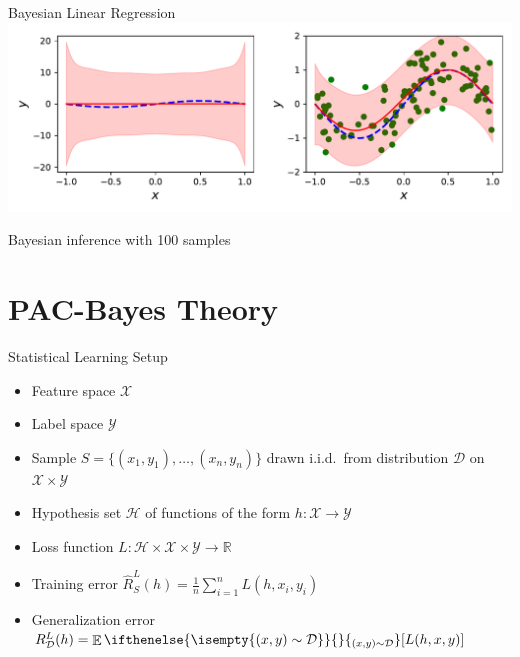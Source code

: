 \documentclass[aspectratio=169]{beamer}
\DeclareMathOperator*{\EvOp}{\mathbb{E}}
\newcommand{\CD}{\mathcal{D}}
\newcommand{\CH}{\mathcal{H}}
\newcommand{\CX}{\mathcal{X}}
\newcommand{\CY}{\mathcal{Y}}
\newcommand{\RR}{\mathbb{R}}
\newcommand*{\Ev}[2][]{%
  \mathchoice{%
    \EvOp\ifthenelse{\isempty{#1}}{}{_{#1}}\left[#2\right]%
  }{%
    \EvOp\ifthenelse{\isempty{#1}}{}{_{#1}}[#2]%
  }{%
    \EvOp\ifthenelse{\isempty{#1}}{}{_{#1}}[#2]%
  }{%
    \EvOp\ifthenelse{\isempty{#1}}{}{_{#1}}[#2]%
  }%
}
\begin{document}
\begin{frame}{Bayesian Linear Regression}
  \centering
  \includegraphics[width=\textwidth]{../figures/bayesian_regression_3.pdf}

  Bayesian inference with 100 samples
\end{frame}

\section{PAC-Bayes Theory}

\begin{frame}{Statistical Learning Setup}
  \begin{itemize}
    \item
      Feature space $\CX$
    \item
      Label space $\CY$
    \item
      Sample $S = \{(x_1, y_1), \ldots, (x_n, y_n)\}$ drawn i.i.d.\ from
      distribution $\CD$ on $\CX \times \CY$
    \item
      Hypothesis set $\CH$ of functions of the form $h : \CX \to \CY$
    \item
      Loss function $L : \CH \times \CX \times \CY \to \RR$
    \item
      Training error $\hat{R}_S^L(h) = \frac{1}{n} \sum_{i = 1}^n L(h, x_i,
      y_i)$
    \item
      Generalization error $R_\CD^L(h) = \Ev[(x, y) \sim \CD]{L(h, x, y)}$
  \end{itemize}
\end{frame}
\end{document}
